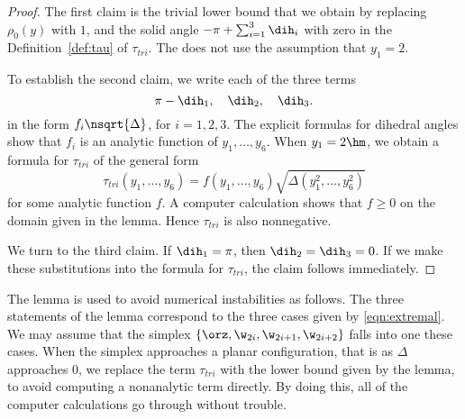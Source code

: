 \begin{proof}
The first claim is the trivial lower bound that we obtain by replacing
$\rho_0(y)$
with $1$, and the solid angle $-\pi+\sum_{i=1}^3 \dih_i$ with zero
in the Definition~\ref{def:tau} of $\tau_{tri}$.  The does not use the
assumption that $y_1=2$.

To establish the second claim, we write each of the three terms 
\[
\pi-\dih_1,\quad\dih_2,\quad \dih_3.
\]
in the form $f_i\nsqrt{\Delta}$, for $i=1,2,3$.  The explicit formulas
for dihedral angles show that $f_i$ is an analytic function of
$y_1,\ldots,y_6$.  When $y_1=2\hm$, we obtain a formula for
$\tau_{tri}$ of the general form
\[
\tau_{tri}(y_1,\ldots,y_6)= f(y_1,\ldots,y_6)\sqrt{\Delta(y_1^2,\ldots,y_6^2)}
\]
for some analytic function $f$.  A computer calculation shows that $f\ge0$
on the domain given in the lemma. Hence $\tau_{tri}$ is also nonnegative.

We turn to the third claim.  If $\dih_1=\pi$, then $\dih_2=\dih_3=0$.
If we make these substitutions into the formula for $\tau_{tri}$, the
claim follows immediately.
\end{proof}

The lemma is used to avoid numerical instabilities as follows.  The
three statements of the lemma correspond to the three cases given by
\eqref{eqn:extremal}.  We may assume that the simplex
$\{\orz,\w_{2i},\w_{2i+1},\w_{2i+2}\}$ falls into one these cases.
When the simplex approaches a planar configuration, that is as
$\Delta$ approaches $0$, we replace the term $\tau_{tri}$ with the
lower bound given by the lemma, to avoid computing a nonanalytic
term directly.  By doing this, all of the computer calculations go
through without trouble.

